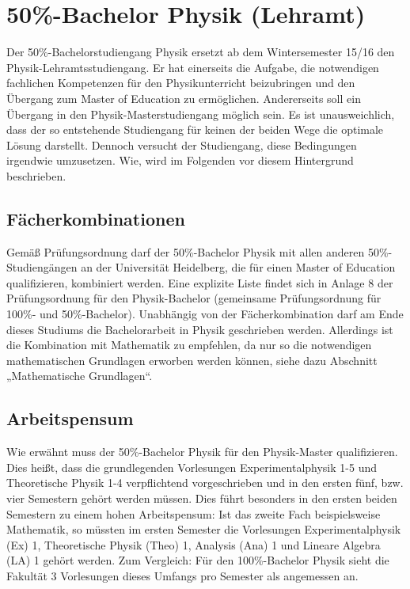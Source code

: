 \section{50\%-Bachelor Physik (Lehramt)} %

Der 50\%-Bachelorstudiengang Physik ersetzt ab dem Wintersemester 15/16 den
Physik-Lehramtsstudiengang. Er hat einerseits die Aufgabe, die notwendigen
fachlichen Kompetenzen für den Physikunterricht beizubringen und den
Übergang zum Master of Education zu ermöglichen. Andererseits soll ein
Übergang in den Physik-Masterstudiengang möglich sein. Es ist
unausweichlich, dass der so entstehende Studiengang für keinen der beiden
Wege die optimale Lösung darstellt. Dennoch versucht der Studiengang, diese
Bedingungen irgendwie umzusetzen. Wie, wird im Folgenden vor diesem Hintergrund
beschrieben.


\subsection{Fächerkombinationen}

Gemäß Prüfungsordnung darf der 50\%-Bachelor Physik mit allen anderen
50\%-Studiengängen an der Universität Heidelberg, die für einen Master of
Education qualifizieren, kombiniert werden. Eine explizite Liste findet sich
in Anlage 8 der Prüfungsordnung für den Physik-Bachelor (gemeinsame
Prüfungsordnung für 100\%- und 50\%-Bachelor). Unabhängig von der
Fächerkombination darf am Ende dieses Studiums die Bachelorarbeit in Physik
geschrieben werden. Allerdings ist die Kombination mit Mathematik zu
empfehlen, da nur so die notwendigen mathematischen Grundlagen erworben
werden können, siehe dazu Abschnitt „Mathematische Grundlagen“.


\subsection{Arbeitspensum}

Wie erwähnt muss der 50\%-Bachelor Physik für den Physik-Master
qualifizieren. Dies heißt, dass die grundlegenden Vorlesungen
Experimentalphysik 1-5 und Theoretische Physik 1-4 verpflichtend
vorgeschrieben und in den ersten fünf, bzw. vier Semestern gehört werden
müssen. Dies führt besonders in den ersten beiden Semestern zu einem hohen
Arbeitspensum: Ist das zweite Fach beispielsweise Mathematik, so müssten im
ersten Semester die Vorlesungen Experimentalphysik (Ex) 1, Theoretische
Physik (Theo) 1, Analysis (Ana) 1 und Lineare Algebra (LA) 1 gehört werden.
Zum Vergleich: Für den 100\%-Bachelor Physik sieht die Fakultät 3
Vorlesungen dieses Umfangs pro Semester als angemessen an.

